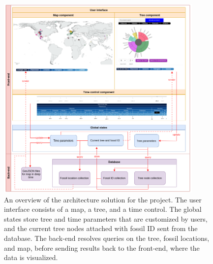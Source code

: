 \documentclass[11pt, a4paper,oneside,chapterprefix=false]{scrbook}
\begin{document}
\begin{figure}[h]
	\centering
	\includegraphics[width=0.9\textwidth]{figures/technical_solution/architecture}
	\caption{An overview of the architecture solution for the project. The user interface consists of a map, a tree, and a time control. The global states store tree and time parameters that are customized by users, and the current tree nodes attached with fossil ID sent from the database. The back-end resolves queries on the tree, fossil locations, and map, before sending results back to the front-end, where the data is visualized. }
	\label{fig:architecture}
\end{figure}
\end{document}
